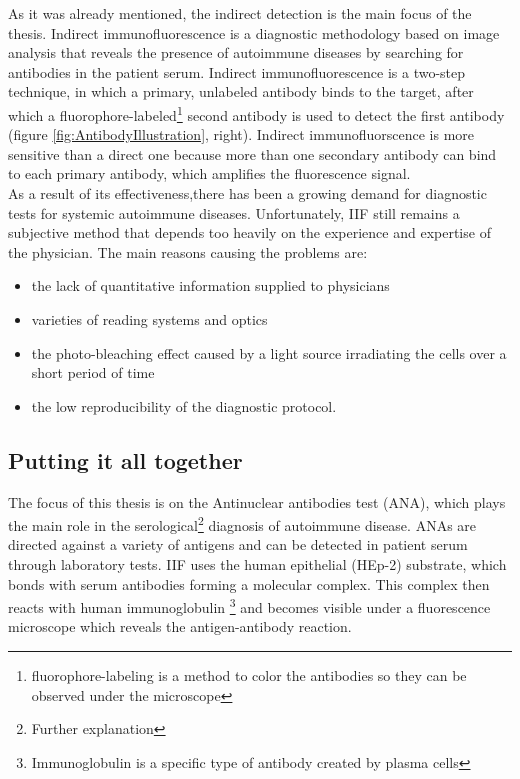 As it was already mentioned, the indirect detection is the main focus of the thesis. Indirect immunofluorescence is a diagnostic methodology based on image analysis that reveals the presence of autoimmune diseases by searching for antibodies in the patient serum. Indirect immunofluorescence is a two-step technique, in which a primary, unlabeled antibody binds to the target, after which a fluorophore-labeled\footnote{fluorophore-labeling is a method to color the antibodies so they can be observed under the microscope} second antibody is used to detect the first antibody (figure \ref{fig:AntibodyIllustration}, right). Indirect immunofluorscence is more sensitive than a direct one because more than one secondary antibody can bind to each primary antibody, which amplifies the fluorescence signal. \\

As a result of its effectiveness,there has been a growing demand for diagnostic tests for systemic autoimmune diseases. Unfortunately,  IIF still remains a subjective method that depends too heavily on the experience and expertise of the physician. The main reasons causing the problems are:
\begin{itemize}
	\item the lack of quantitative information supplied to physicians
	\item varieties of reading systems and optics
	\item the photo-bleaching effect caused by a light source irradiating the cells over a short period of time
	\item the low reproducibility of the diagnostic protocol.
\end{itemize}

\subsection{Putting it all together}

The focus of this thesis is on the Antinuclear antibodies  test (ANA), which plays the main role in the serological\footnote{Further explanation} diagnosis of autoimmune disease. ANAs are directed against a variety of antigens and can be detected in patient serum through laboratory tests. IIF uses the human epithelial (HEp-2) substrate, which bonds with serum antibodies forming a molecular complex. This complex then reacts with human immunoglobulin \footnote{Immunoglobulin is a specific type of antibody created by plasma cells} and becomes visible under a fluorescence microscope which reveals the antigen-antibody reaction. \\

